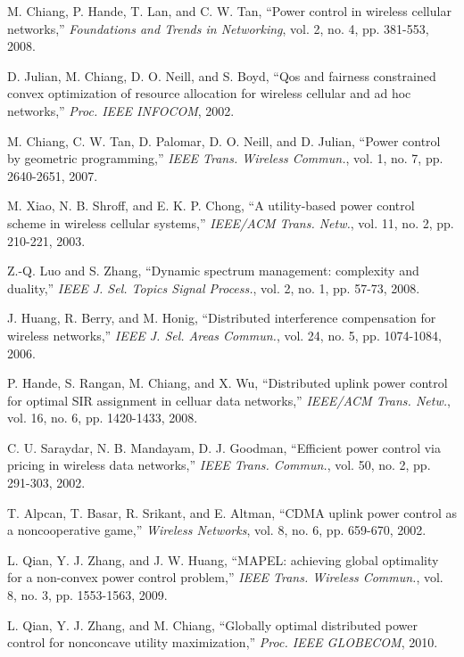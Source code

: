 \documentclass[10pt,journal,letterpaper,compsoc]{IEEEtran}
\begin{document}
{{\begin{thebibliography}{10}
M. Chiang, P. Hande, T. Lan, and C. W. Tan, ``Power control in wireless cellular networks,'' \emph{Foundations and Trends in Networking}, vol. 2, no. 4, pp. 381-553, 2008.

D. Julian, M. Chiang, D. O. Neill, and S. Boyd, ``Qos and fairness constrained convex optimization of resource allocation for wireless cellular and ad hoc networks,'' \emph{Proc. IEEE INFOCOM}, 2002.

M. Chiang, C. W. Tan, D. Palomar, D. O. Neill, and D. Julian, ``Power control by geometric programming,'' \emph{IEEE Trans. Wireless Commun.}, vol. 1, no. 7, pp. 2640-2651, 2007.

M. Xiao, N. B. Shroff, and E. K. P. Chong, ``A utility-based power control scheme in wireless cellular systems,'' \emph{IEEE/ACM Trans. Netw.}, vol. 11, no. 2, pp. 210-221, 2003.

Z.-Q. Luo and S. Zhang, ``Dynamic spectrum management: complexity and duality,'' \emph{IEEE J. Sel. Topics Signal Process.}, vol. 2, no. 1, pp. 57-73, 2008.

J. Huang, R. Berry, and M. Honig, ``Distributed interference compensation for wireless networks,'' \emph{IEEE J. Sel. Areas Commun.}, vol. 24, no. 5, pp. 1074-1084, 2006.

P. Hande, S. Rangan, M. Chiang, and X. Wu, ``Distributed uplink power control for optimal SIR assignment in celluar data networks,'' \emph{IEEE/ACM Trans. Netw.}, vol. 16, no. 6, pp. 1420-1433, 2008.


C. U. Saraydar, N. B. Mandayam, D. J. Goodman, ``Efficient power control via pricing in wireless data networks,'' \emph{IEEE Trans. Commun.}, vol. 50, no. 2, pp. 291-303, 2002.



T. Alpcan, T. Basar, R. Srikant, and E. Altman, ``CDMA uplink power control as a noncooperative game,'' \emph{Wireless Networks}, vol. 8, no. 6, pp. 659-670, 2002.

L. Qian, Y. J. Zhang, and J. W. Huang, ``MAPEL: achieving global optimality for a non-convex power control problem,'' \emph{IEEE Trans. Wireless Commun.}, vol. 8, no. 3, pp. 1553-1563, 2009.


L. Qian, Y. J. Zhang, and M. Chiang, ``Globally optimal distributed power control for nonconcave utility maximization,'' \emph{Proc. IEEE GLOBECOM}, 2010.


\end{thebibliography}}}
\end{document}
